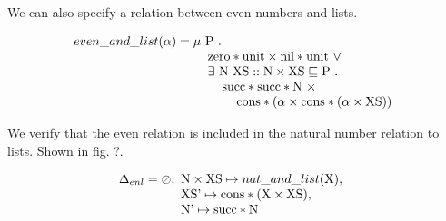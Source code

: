 \documentclass[sigplan]{acmart}
\theoremstyle{definition}
\begin{document}
We can also specify a relation between even numbers and lists.  

\[
even\_and\_list(\alpha) =  
\begin{array}[t]{@{} l}
  \mu\ \text{P}\ .\ 
  \\
  \hspace{4mm}\text{zero}*\text{unit} \times \text{nil}*\text{unit}\ \vee\ 
  \\
  \hspace{4mm}\exists\ \text{N}\ \text{XS} :: \text{N} \times \text{XS} \sqsubseteq \text{P}\ .\ 
  \\
  \hspace{8mm}\text{succ}*\text{succ}*\text{N}\ \times 
  \\
  \hspace{12mm}\text{cons}*(\alpha \times \text{cons}*(\alpha \times \text{XS}))
\end{array}
\]

We verify that the even relation is included in the natural number relation to lists.  
Shown in fig. ?.

\[
\Delta_{enl} = \oslash,\ 
\begin{array}[t]{@{} l}
  \text{N} \times \text{XS} \mapsto nat\_and\_list(\text{X}),\ 
  \\
  \text{XS'} \mapsto \text{cons}*(\text{X} \times \text{XS}),\ 
  \\
  \text{N'} \mapsto \text{succ}*\text{N}
\end{array}
\]
\end{document}
